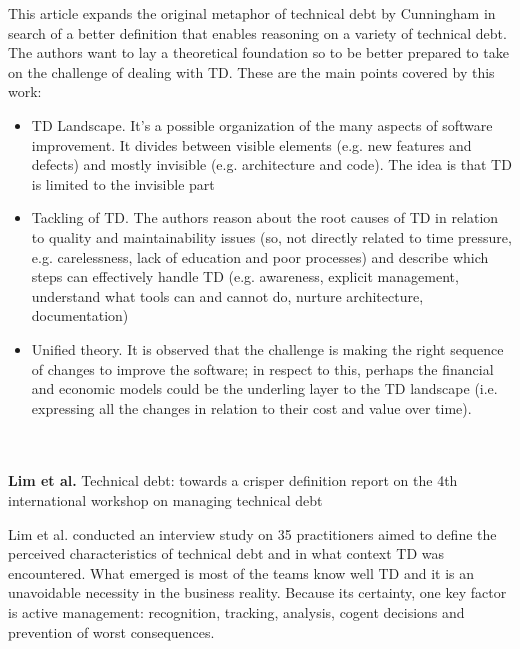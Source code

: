 This article expands the original metaphor of technical debt by Cunningham \cite{cunningham1992wycash} in search of a better definition that enables reasoning on a variety of technical debt.
The authors want to lay a theoretical foundation so to be better prepared to take on the challenge of dealing with TD. These are the main points covered by this work:
\begin{itemize}
    \item TD Landscape. It's a possible organization of the many aspects of software improvement. It divides between visible elements (e.g. new features and defects) and mostly invisible (e.g. architecture and code). The idea is that TD is limited to the invisible part
    \item Tackling of TD. The authors reason about the root causes of TD in relation to quality and maintainability issues (so, not directly related to time pressure, e.g. carelessness, lack of education and poor processes) and describe which steps can effectively handle TD (e.g. awareness, explicit management, understand what tools can and cannot do, nurture architecture, documentation)
    \item Unified theory. It is observed that the challenge is making the right sequence of changes to improve the software; in respect to this, perhaps the financial and economic models could be the underling layer to the TD landscape (i.e. expressing all the changes in relation to their cost and value over time).
\end{itemize}
\\
\\
\textbf{Lim et al.} \cite{lim2012balancing} Technical debt: towards a crisper definition report on the 4th international workshop on managing technical debt
 
Lim et al. conducted an interview study on 35 practitioners aimed to define the perceived characteristics of technical debt and in what context TD was encountered. What emerged is most of the teams know well TD and it is an unavoidable necessity in the business reality. Because its certainty, one key factor is active management: recognition, tracking, analysis, cogent decisions and prevention of worst consequences.
 
